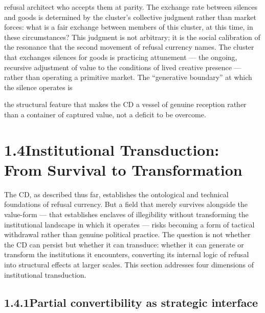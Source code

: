 refusal architect who accepts them at parity. The exchange rate between silences and goods is determined by the cluster’s collective judgment rather than market forces: what is a fair exchange between members of this cluster, at this time, in these circumstances? This judgment is not arbitrary; it is the social calibration of the resonance that the second movement of refusal currency names. The cluster that exchanges silences for goods is practicing attunement — the ongoing, recursive adjustment of value to the conditions of lived creative presence — rather than operating a primitive market. The “generative boundary” at which the silence operates is

the structural feature that makes the CD a vessel of genuine reception rather than a container of captured value, not a deficit to be overcome.

\section{1.4\quad Institutional Transduction: From Survival to Transformation}

The CD, as described thus far, establishes the ontological and technical foundations of refusal currency. But a field that merely survives alongside the value-form — that establishes enclaves of illegibility without transforming the institutional landscape in which it operates — risks becoming a form of tactical withdrawal rather than genuine political practice. The question is not whether the CD can persist but whether it can transduce: whether it can generate or transform the institutions it encounters, converting its internal logic of refusal into structural effects at larger scales. This section addresses four dimensions of institutional transduction.

\subsection{1.4.1\quad Partial convertibility as strategic interface}

